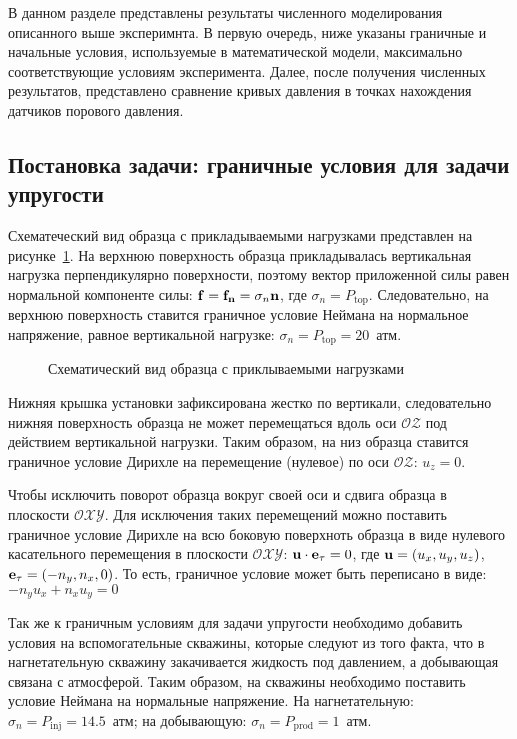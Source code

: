 В данном разделе представлены результаты численного моделирования описанного выше эксперимнта. В первую очередь, ниже указаны граничные и начальные условия, используемые в математической модели, максимально соответствующие условиям эксперимента. Далее, после получения численных результатов, представлено сравнение кривых давления в точках нахождения датчиков порового давления.

\subsection{Постановка задачи: граничные условия для задачи упругости}

Схематеческий вид образца с прикладываемыми нагрузками представлен на рисунке~\ref{device5:pict}. На верхнюю поверхность образца прикладывалась вертикальная нагрузка перпендикулярно поверхности, поэтому вектор приложенной силы равен нормальной компоненте силы: $\mathbf{f}=\mathbf{f_n}=\sigma_n \mathbf{n}$, где $\sigma_n=P_\text{top}$. Следовательно, на верхнюю поверхность ставится граничное условие Неймана на нормальное напряжение, равное вертикальной нагрузке: $\sigma_n = P_\text{top} = 20$~атм.

\begin{figure}[hb]
\begin{center}
\end{center}
\caption{Схематический вид образца с приклываемыми нагрузками}\label{device5:pict}
\end{figure}

Нижняя крышка установки зафиксирована жестко по вертикали, следовательно нижняя поверхность образца не может перемещаться вдоль оси $\mathcal{OZ}$ под действием вертикальной нагрузки. Таким образом, на низ образца ставится граничное условие Дирихле на перемещение (нулевое) по оси  $\mathcal{OZ}$: $u_z = 0$.

Чтобы исключить поворот образца вокруг своей оси и сдвига образца в плоскости $\mathcal{OXY}$. Для исключения таких перемещений можно поставить граничное условие Дирихле на всю боковую поверхноть образца в виде нулевого касательного перемещения в плоскости $\mathcal{OXY}$: $\mathbf{u} \cdot \mathbf{e_\tau}=0$, где  $\mathbf{u}=(u_x, u_y, u_z)$, $\mathbf{e_\tau}=(-n_y, n_x, 0)$. То есть, граничное условие может быть переписано в виде: $-n_y u_x + n_x u_y=0$

Так же к граничным условиям для задачи упругости необходимо добавить условия на вспомогательные скважины, которые следуют из того факта, что в нагнетательную скважину закачивается жидкость под давлением, а добывающая связана с атмосферой. Таким образом, на скважины необходимо поставить условие Неймана на нормальные напряжение. На нагнетательную: $\sigma_n = P_\text{inj}=14.5$~атм; на добывающую: $\sigma_n =P_\text{prod}=1$~атм.

